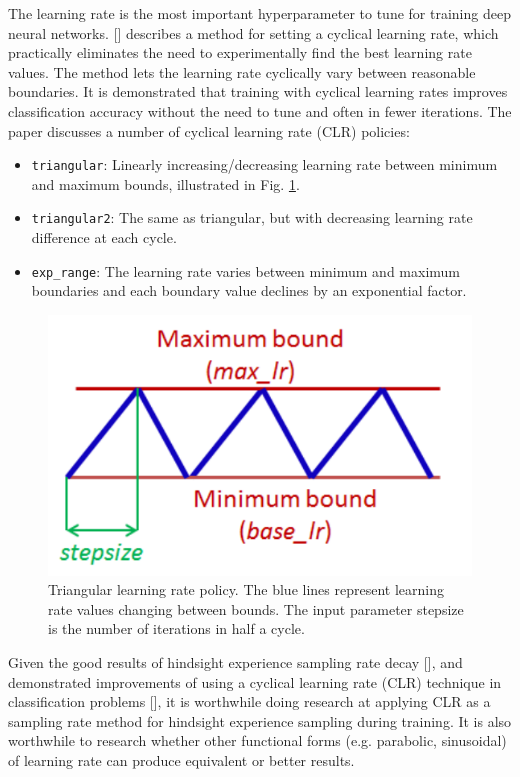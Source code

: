 \documentclass[conference]{IEEEtran}
\begin{document}
The learning rate is the most important hyperparameter to tune for training deep neural networks. [\cite{smith2017cyclical}] describes a method for setting a cyclical learning rate, which practically eliminates the need to experimentally find the best learning rate values. The method lets the learning rate cyclically vary between reasonable boundaries. It is demonstrated that training with cyclical learning rates improves classification accuracy without the need to tune and often in fewer iterations. The paper discusses a number of cyclical learning rate (CLR) policies:
\begin{itemize}
    \item \texttt{triangular}: Linearly increasing/decreasing learning rate between minimum and maximum bounds, illustrated in Fig. \ref{fig:research_clr}.
    \item \texttt{triangular2}: The same as triangular, but with decreasing learning rate difference at each cycle.
    \item \texttt{exp\_range}: The learning rate varies between minimum and maximum boundaries and each boundary value declines by an exponential factor.
\end{itemize}
\begin{figure}[ht]
\centering
\includegraphics[width=0.7\columnwidth]{img/CLR.png}
\caption{Triangular learning rate policy. The blue lines represent learning rate values changing between bounds. The input parameter stepsize is the number of iterations in half a cycle.}
\label{fig:research_clr}
\end{figure}

Given the good results of hindsight experience sampling rate decay [\cite{vecchietti2020sampling}], and demonstrated improvements of using a cyclical learning rate (CLR) technique in classification problems [\cite{smith2017cyclical}], it is worthwhile doing research at applying CLR as a sampling rate method for hindsight experience sampling during training. It is also worthwhile to research whether other functional forms (e.g. parabolic, sinusoidal) of learning rate can produce equivalent or better results.
\newpage
\printbibliography
\end{document}
